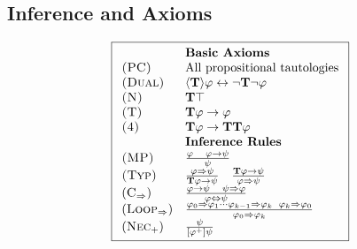 \documentclass[letterpaper]{article}
\theoremstyle{definition}
\newcommand{\Typ}{\textrm{\textup{\textbf{T}}}}
\newcommand{\axiom}{\textsc}
\begin{document}
\subsection{Inference and Axioms}


\begin{figure}[ht!]
\begin{equation*}
\boxed{
\begin{array}{ll}
    & \textbf{Basic Axioms}\\
    
    \axiom{(PC)} & \mbox{All propositional tautologies}\\

    \axiom{(Dual)} & \langle \Typ \rangle \varphi \leftrightarrow \neg \Typ \neg \varphi\\
    
    \axiom{(N)} & \Typ \top\\
    
    \axiom{(T)} & \Typ \varphi \to \varphi\\
    
    \axiom{(4)} & \Typ \varphi \to \Typ \Typ \varphi\\
    
    & \textbf{Inference Rules}\\

    \axiom{(MP)} & \frac{\varphi \quad \varphi \to \psi}{\psi} \\
    
    \axiom{(Typ)} & \frac{\varphi \Rightarrow \psi}{\Typ \varphi \to \psi} \quad \frac{\Typ \varphi \to \psi}{\varphi \Rightarrow \psi} \\

    
    (\axiom{C}_\Rightarrow) & \frac{\varphi \to \psi \quad \psi \Rightarrow \varphi}{\varphi \Leftrightarrow \psi} \\
    
    (\axiom{Loop}_\Rightarrow) & 
    \frac{\varphi_0 \Rightarrow \varphi_1
    \cdots
    \varphi_{k-1} \Rightarrow \varphi_k \enskip
    \varphi_k \Rightarrow \varphi_0}
    {\varphi_0 \Rightarrow \varphi_k} \\
    
    (\axiom{Nec}_+) & \frac{\psi}{[\varphi^+] \psi} \\
    

\end{array}}
\end{equation*}
\end{figure}
\end{document}
